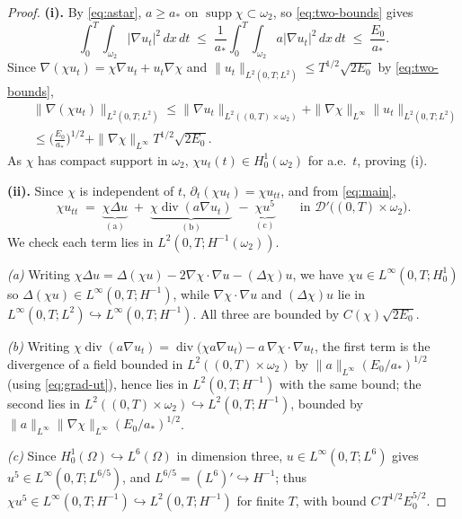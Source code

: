 \documentclass[11pt,letterpaper]{amsart}
\newcommand{\dive}{\operatorname{div}}
\newcommand{\Om}{\Omega}
\begin{document}
\begin{proof}
\textbf{(i).} By \eqref{eq:astar}, $a\ge a_*$ on $\operatorname{supp}\chi\subset\omega_2$, so
\eqref{eq:two-bounds} gives
\begin{equation}\label{eq:grad-ut}
\int_0^{T}\!\!\int_{\omega_2}|\nabla u_t|^2\,dx\,dt
\;\le\; \frac1{a_*}\int_0^{T}\!\!\int_{\omega_2}a|\nabla u_t|^2\,dx\,dt \;\le\; \frac{E_0}{a_*}.
\end{equation}
Since $\nabla(\chi u_t)=\chi\nabla u_t+u_t\nabla\chi$ and
$\|u_t\|_{L^2(0,T;L^2)}\le T^{1/2}\sqrt{2E_0}$ by \eqref{eq:two-bounds},
\begin{eqnarray*}
&&\|\nabla(\chi u_t)\|_{L^2(0,T;L^2)}\le \|\nabla u_t\|_{L^2((0,T)\times\omega_2)}
+\|\nabla\chi\|_{L^\infty}\|u_t\|_{L^2(0,T;L^2)}\\
&&\le \Big(\frac{E_0}{a_*}\Big)^{1/2}+\|\nabla\chi\|_{L^\infty}T^{1/2}\sqrt{2E_0}.
\end{eqnarray*}
As $\chi$ has compact support in $\omega_2$, $\chi u_t(t)\in H_0^1(\omega_2)$ for a.e.\ $t$,
proving (i).

\textbf{(ii).} Since $\chi$ is independent of $t$, $\partial_t(\chi u_t)=\chi u_{tt}$, and from
\eqref{eq:main},
\begin{equation}\label{eq:three-terms}
\chi u_{tt} \;=\; \underbrace{\chi\Delta u}_{(\mathrm a)} \;+\; \underbrace{\chi\dive(a\nabla u_t)}_{(\mathrm b)} \;-\; \underbrace{\chi u^5}_{(\mathrm c)}
\qquad\text{in }\mathcal D'\big((0,T)\times\omega_2\big).
\end{equation}
We check each term lies in $L^2(0,T;H^{-1}(\omega_2))$.

\emph{(a)} Writing $\chi\Delta u=\Delta(\chi u)-2\nabla\chi\cdot\nabla u-(\Delta\chi)u$, we have
$\chi u\in L^\infty(0,T;H_0^1)$ so $\Delta(\chi u)\in L^\infty(0,T;H^{-1})$, while
$\nabla\chi\cdot\nabla u$ and $(\Delta\chi)u$ lie in $L^\infty(0,T;L^2)\hookrightarrow
L^\infty(0,T;H^{-1})$. All three are bounded by $C(\chi)\sqrt{2E_0}$.

\emph{(b)} Writing $\chi\dive(a\nabla u_t)=\dive\big(\chi a\nabla u_t\big)-a\,\nabla\chi\cdot\nabla u_t$,
the first term is the divergence of a field bounded in $L^2((0,T)\times\omega_2)$ by
$\|a\|_{L^\infty}(E_0/a_*)^{1/2}$ (using \eqref{eq:grad-ut}), hence lies in $L^2(0,T;H^{-1})$ with
the same bound; the second lies in $L^2((0,T)\times\omega_2)\hookrightarrow L^2(0,T;H^{-1})$,
bounded by $\|a\|_{L^\infty}\|\nabla\chi\|_{L^\infty}(E_0/a_*)^{1/2}$.

\emph{(c)} Since $H_0^1(\Om)\hookrightarrow L^6(\Om)$ in dimension three,
$u\in L^\infty(0,T;L^6)$ gives $u^5\in L^\infty(0,T;L^{6/5})$, and $L^{6/5}=(L^6)'\hookrightarrow
H^{-1}$; thus $\chi u^5\in L^\infty(0,T;H^{-1})\hookrightarrow L^2(0,T;H^{-1})$ for finite $T$,
with bound $C\,T^{1/2}E_0^{5/2}$.


\end{proof}
\end{document}
